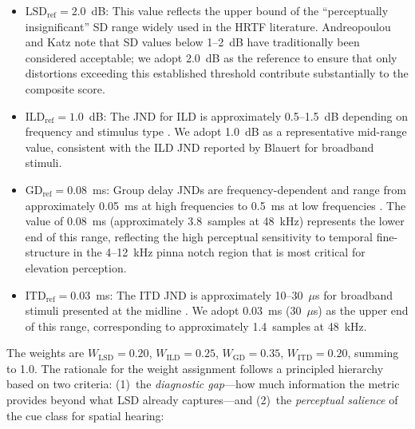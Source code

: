 \documentclass[12pt,a4paper]{article}
\begin{document}
\begin{itemize}
  \item $\mathrm{LSD}_{\mathrm{ref}} = 2.0$~dB: This value reflects the upper bound of the ``perceptually insignificant'' SD range widely used in the HRTF literature. Andreopoulou and Katz \cite{andreopoulou2022} note that SD values below 1--2~dB have traditionally been considered acceptable; we adopt 2.0~dB as the reference to ensure that only distortions exceeding this established threshold contribute substantially to the composite score.
  \item $\mathrm{ILD}_{\mathrm{ref}} = 1.0$~dB: The JND for ILD is approximately 0.5--1.5~dB depending on frequency and stimulus type \cite{blauert1997}. We adopt 1.0~dB as a representative mid-range value, consistent with the ILD JND reported by Blauert for broadband stimuli.
  \item $\mathrm{GD}_{\mathrm{ref}} = 0.08$~ms: Group delay JNDs are frequency-dependent and range from approximately 0.05~ms at high frequencies to 0.5~ms at low frequencies \cite{blauert1997}. The value of 0.08~ms (approximately 3.8~samples at 48~kHz) represents the lower end of this range, reflecting the high perceptual sensitivity to temporal fine-structure in the 4--12~kHz pinna notch region that is most critical for elevation perception.
  \item $\mathrm{ITD}_{\mathrm{ref}} = 0.03$~ms: The ITD JND is approximately 10--30~$\mu$s for broadband stimuli presented at the midline \cite{blauert1997}. We adopt 0.03~ms (30~$\mu$s) as the upper end of this range, corresponding to approximately 1.4~samples at 48~kHz.
\end{itemize}

The weights are $W_{\mathrm{LSD}} = 0.20$, $W_{\mathrm{ILD}} = 0.25$, $W_{\mathrm{GD}} = 0.35$, $W_{\mathrm{ITD}} = 0.20$, summing to 1.0. The rationale for the weight assignment follows a principled hierarchy based on two criteria: (1)~the \textit{diagnostic gap}---how much information the metric provides beyond what LSD already captures---and (2)~the \textit{perceptual salience} of the cue class for spatial hearing:
\end{document}
